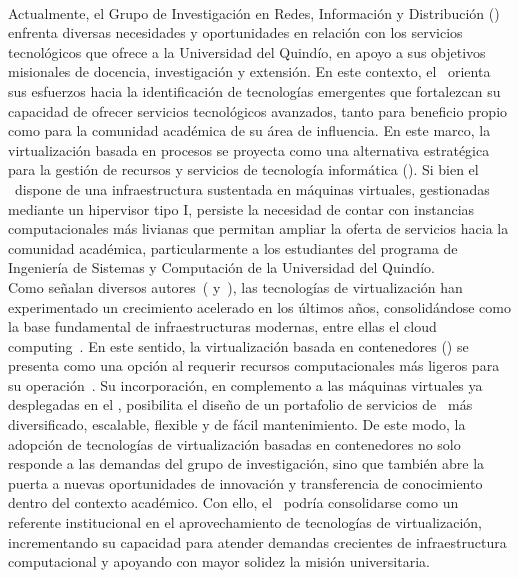 \label{cap:justificacion}
\mbox{}\\
Actualmente, el Grupo de Investigación en Redes, Información y Distribución 
(\GRID) enfrenta diversas necesidades y oportunidades en relación con los servicios 
tecnológicos que ofrece a la Universidad del Quindío, en apoyo a sus objetivos 
misionales de docencia, investigación y extensión. En este contexto, el \GRID\ 
orienta sus esfuerzos hacia la identificación de tecnologías emergentes que fortalezcan 
su capacidad de ofrecer servicios tecnológicos avanzados, tanto para beneficio propio 
como para la comunidad académica de su área de influencia. En este marco, la virtualización basada en procesos se proyecta como una alternativa 
estratégica para la gestión de recursos y servicios de tecnología informática 
(\TI). Si bien el \GRID\ dispone de una infraestructura sustentada en máquinas virtuales, 
gestionadas mediante un hipervisor tipo I, persiste la necesidad de contar con instancias 
computacionales más livianas que permitan ampliar la oferta de servicios hacia la comunidad 
académica, particularmente a los estudiantes del programa de Ingeniería de Sistemas y 
Computación de la Universidad del Quindío.\\
Como señalan diversos autores~(\citep{Chingo2021} y~\citep{DOGANI2023120}), las tecnologías de virtualización han experimentado un 
crecimiento acelerado en los últimos años, consolidándose como la base fundamental de 
infraestructuras modernas, entre ellas el cloud computing~\citep{Sepulveda-Rodriguez2022}. 
En este sentido, la virtualización basada en contenedores (\VBC) se presenta como una opción 
al requerir recursos computacionales más ligeros para su operación~\citep{Xavier2013}. 
Su incorporación, en complemento a las máquinas virtuales ya desplegadas en el \GRID, 
posibilita el diseño de un portafolio de servicios de \TI\ más diversificado, escalable, 
flexible y de fácil mantenimiento. De este modo, la adopción de tecnologías de virtualización basadas en contenedores no solo 
responde a las demandas del grupo de investigación, sino que también abre la 
puerta a nuevas oportunidades de innovación y transferencia de conocimiento dentro del 
contexto académico. Con ello, el \GRID\ podría consolidarse como un referente institucional 
en el aprovechamiento de tecnologías de virtualización, incrementando su capacidad para 
atender demandas crecientes de infraestructura computacional y apoyando con mayor solidez 
la misión universitaria.